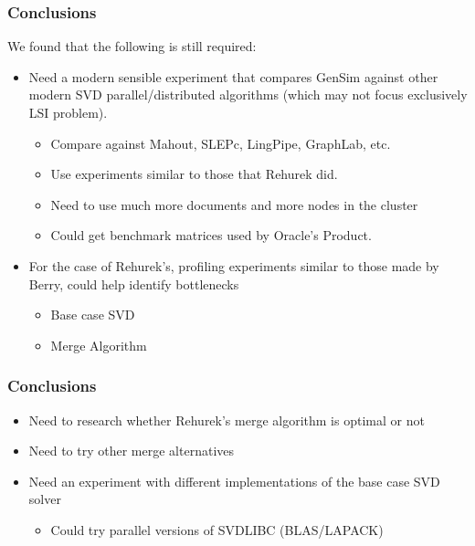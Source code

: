 \begin{frame}[plain]
\frametitle{Conclusions}
\begin{block}{}
We found that the following is still required:
\begin{itemize}
\item Need a modern sensible experiment that compares GenSim against
  other modern SVD parallel/distributed algorithms (which may not focus
  exclusively LSI problem).
\begin{itemize}
\item Compare against Mahout, SLEPc, LingPipe, GraphLab, etc.
\item Use experiments similar to those that Rehurek did. 
\item Need to use much more documents and more nodes in the cluster
\item Could get benchmark matrices used by Oracle's Product.
\end{itemize}
\item For the case of Rehurek's, profiling experiments similar to those made by Berry, could help identify bottlenecks
\begin{itemize}
\item Base case SVD
\item Merge Algorithm
\end{itemize}
\end{itemize}
\end{block}
\end{frame}
\begin{frame}[plain]
\frametitle{Conclusions}
\begin{block}{}
\begin{itemize}
\item Need to research whether Rehurek's merge algorithm is optimal or not
\item Need to try other merge alternatives
\item Need an experiment with different implementations of the base case SVD solver
\begin{itemize}
\item Could try parallel versions of SVDLIBC (BLAS/LAPACK)
\end{itemize}
\end{itemize}
\end{block}
\end{frame}
